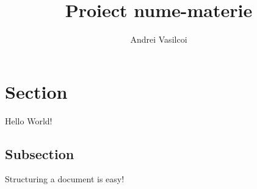 \documentclass{article}
\title{Proiect nume-materie}
\author{Andrei Vasilcoi}
\begin{document}
	\maketitle
	\newpage
	
\section{Section}

Hello World!

\subsection{Subsection}

Structuring a document is easy!
\end{document}
